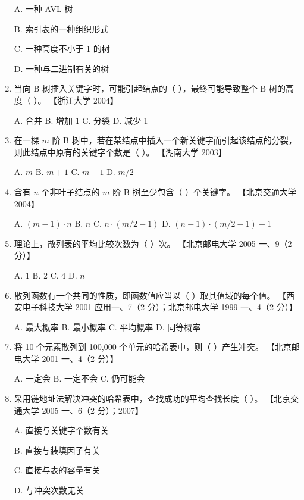 \documentclass[lang=cn,newtx,10pt,scheme=chinese]{../../elegantbook}
\begin{document}
\begin{enumerate}
    A. 一种 AVL 树  

    B. 索引表的一种组织形式  

    C. 一种高度不小于 1 的树  

    D. 一种与二进制有关的树  

    \item 当向 B 树插入关键字时，可能引起结点的（ ），最终可能导致整个 B 树的高度（ ）。  
    【浙江大学 2004】  

    A. 合并 \quad B. 增加 1 \quad C. 分裂 \quad D. 减少 1  

    \item 在一棵 $m$ 阶 B 树中，若在某结点中插入一个新关键字而引起该结点的分裂，则此结点中原有的关键字个数是（ ）。  
    【湖南大学 2003】 

    A. $m$ \quad B. $m+1$ \quad C. $m-1$ \quad D. $m/2$  

    \item 含有 $n$ 个非叶子结点的 $m$ 阶 B 树至少包含（ ）个关键字。  
    【北京交通大学 2004】 

    A. $(m-1) \cdot n$ \quad B. $n$  \quad C. $n \cdot (m/2 - 1)$ \quad D. $(n-1) \cdot (m/2 - 1) + 1$

    \item 理论上，散列表的平均比较次数为（ ）次。  
    【北京邮电大学 2005 一、9（2 分）】  

    A. 1 \quad B. 2 \quad C. 4 \quad D. $n$  

    \item 散列函数有一个共同的性质，即函数值应当以（ ）取其值域的每个值。  
    【西安电子科技大学 2001 应用一、7（2 分）；北京邮电大学 1999 一、4（2 分）】  

    A. 最大概率 \quad B. 最小概率 \quad C. 平均概率 \quad D. 同等概率  

    \item 将 10 个元素散列到 100,000 个单元的哈希表中，则（ ）产生冲突。  
    【北京邮电大学 2001 一、4（2 分）】  

    A. 一定会 \quad B. 一定不会 \quad C. 仍可能会  

    \item 采用链地址法解决冲突的哈希表中，查找成功的平均查找长度（ ）。  
    【北京交通大学 2005 一、6（2 分）；2007】  

    A. 直接与关键字个数有关  

    B. 直接与装填因子有关  

    C. 直接与表的容量有关  

    D. 与冲突次数无关  


\end{enumerate}
\end{document}
